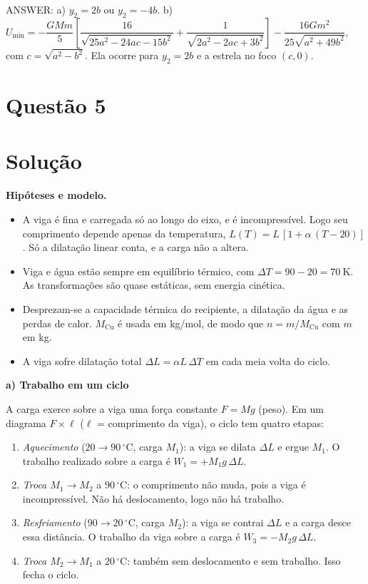 \documentclass{article}%
\begin{document}
ANSWER: a) $y_2=2b$ ou $y_2=-4b$. b) $U_{\min}=-\dfrac{GMm}{5}\left[\dfrac{16}{\sqrt{25a^2-24ac-15b^2}}+\dfrac{1}{\sqrt{2a^2-2ac+3b^2}}\right]-\dfrac{16Gm^2}{25\sqrt{a^2+49b^2}}$, com $c=\sqrt{a^2-b^2}$. Ela ocorre para $y_2=2b$ e a estrela no foco $(c,0)$.%
\newpage%
\section*{Questão 5}

\section*{Solução}

\textbf{Hipóteses e modelo.}
\begin{itemize}
\item A viga é fina e carregada só ao longo do eixo, e é incompressível. Logo seu comprimento depende apenas da temperatura, $L(T)=L\,[1+\alpha\,(T-20)]$. Só a dilatação linear conta, e a carga não a altera.
\item Viga e água estão sempre em equilíbrio térmico, com $\Delta T = 90-20 = 70\ \mathrm{K}$. As transformações são quase estáticas, sem energia cinética.
\item Desprezam-se a capacidade térmica do recipiente, a dilatação da água e as perdas de calor. $M_{\mathrm{Cu}}$ é usada em kg/mol, de modo que $n=m/M_{\mathrm{Cu}}$ com $m$ em kg.
\item A viga sofre dilatação total $\Delta L=\alpha L\,\Delta T$ em cada meia volta do ciclo.
\end{itemize}

\medskip
\textbf{a) Trabalho em um ciclo}

A carga exerce sobre a viga uma força constante $F=Mg$ (peso). Em um diagrama $F\times \ell$ ($\ell$ = comprimento da viga), o ciclo tem quatro etapas:

\begin{enumerate}
\item \emph{Aquecimento} ($20\to90\,^\circ\mathrm{C}$, carga $M_1$): a viga se dilata $\Delta L$ e ergue $M_1$. O trabalho realizado sobre a carga é $W_1=+M_1 g\,\Delta L$.
\item \emph{Troca $M_1\to M_2$} a $90\,^\circ\mathrm{C}$: o comprimento não muda, pois a viga é incompressível. Não há deslocamento, logo não há trabalho.
\item \emph{Resfriamento} ($90\to20\,^\circ\mathrm{C}$, carga $M_2$): a viga se contrai $\Delta L$ e a carga desce essa distância. O trabalho da viga sobre a carga é $W_3=-M_2 g\,\Delta L$.
\item \emph{Troca $M_2\to M_1$} a $20\,^\circ\mathrm{C}$: também sem deslocamento e sem trabalho. Isso fecha o ciclo.
\end{enumerate}
\end{document}
